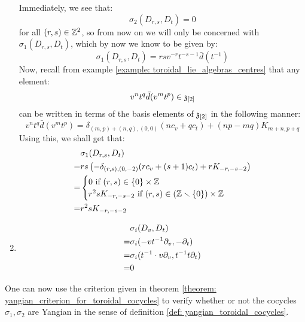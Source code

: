 \begin{example}
\begin{enumerate}
                Immediately, we see that:
                    $$\sigma_2(D_{r, s}, D_t) = 0$$
                for all $(r, s) \in \mathbb{Z}^2$, so from now on we will only be concerned with $\sigma_1(D_{r, s}, D_t)$, which by now we know to be given by:
                    $$\sigma_1(D_{r, s}, D_t) = rs v^{-r} t^{-s - 1} \bar{d}(t^{-1})$$
                Now, recall from example \ref{example: toroidal_lie_algebras_centres} that any element:
                    $$v^n t^q \bar{d}(v^m t^p) \in \mathfrak{z}_{[2]}$$
                can be written in terms of the basis elements of $\mathfrak{z}_{[2]}$ in the following manner:
                    $$v^n t^q \bar{d}(v^m t^p) = \delta_{(m, p) + (n, q), (0, 0)} ( n c_v + q c_t ) + (np - mq) K_{m + n, p + q}$$
                Using this, we shall get that:
                    $$
                        \begin{aligned}
                            & \sigma_1(D_{r, s}, D_t)
                            \\
                            = & rs \left( -\delta_{(r, s), (0, -2)} ( r c_v + (s + 1) c_t ) + r K_{-r, -s - 2} \right)
                            \\
                            = & 
                            \begin{cases}
                                \text{$0$ if $(r, s) \in \{0\} \x \Z$}
                                \\
                                \text{$r^2s K_{-r, -s - 2}$ if $(r, s) \in (\Z \setminus \{0\}) \x \Z$}
                            \end{cases}
                            \\
                            = & r^2s K_{-r, -s - 2}
                        \end{aligned}
                    $$
                \item
                    $$
                        \begin{aligned}
                            & \sigma_i(D_v, D_t)
                            \\
                            = & \sigma_i(-v t^{-1} \partial_v, -\partial_t)
                            \\
                            = & \sigma_i(t^{-1} \cdot v \partial_v, t^{-1} t \partial_t)
                            \\
                            = & 0
                        \end{aligned}
                    $$
            \end{enumerate}
            One can now use the criterion given in theorem \ref{theorem: yangian_criterion_for_toroidal_cocycles} to verify whether or not the cocycles $\sigma_1, \sigma_2$ are Yangian in the sense of definition \ref{def: yangian_toroidal_cocycles}.
        \end{example}

